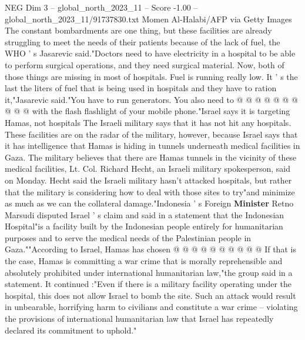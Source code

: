 \begin{textsample}{NEG Dim 3 – global\_north\_2023\_11 – Score -1.00 – global\_north\_2023\_11/91737830.txt}
Momen Al-Halabi/AFP via Getty Images The constant bombardments are one thing, but these facilities are already struggling to meet the needs of their patients because of the lack of fuel, the WHO ' s Jasarevic said."Doctors need to have electricity in a hospital to be able to perform surgical operations, and they need surgical material.
Now, both of those things are missing in most of hospitals.
Fuel is running really low.
It ' s the last the liters of fuel that is being used in hospitals and they have to ration it,"Jasarevic said."You have to run generators.
You also need to @ @ @ @ @ @ @ @ @ @ with the flash flashlight of your mobile phone."Israel says it is targeting Hamas, not hospitals The Israeli military says that it has not hit any hospitals.
These facilities are on the radar of the military, however, because Israel says that it has intelligence that Hamas is hiding in tunnels underneath medical facilities in Gaza.
The military believes that there are Hamas tunnels in the vicinity of these medical facilities, Lt.
Col.
Richard Hecht, an Israeli military spokesperson, said on Monday.
Hecht said the Israeli military hasn't attacked hospitals, but rather that the military is considering how to deal with those sites to try"and minimize as much as we can the collateral damage."Indonesia ' s Foreign \textbf{Minister} Retno Marsudi disputed Israel ' s claim and said in a statement that the Indonesian Hospital"is a facility built by the Indonesian people entirely for humanitarian purposes and to serve the medical needs of the Palestinian people in Gaza.""According to Israel, Hamas has chosen @ @ @ @ @ @ @ @ @ @ If that is the case, Hamas is committing a war crime that is morally reprehensible and absolutely prohibited under international humanitarian law,"the group said in a statement.
It continued :"Even if there is a military facility operating under the hospital, this does not allow Israel to bomb the site.
Such an attack would result in unbearable, horrifying harm to civilians and constitute a war crime -- violating the provisions of international humanitarian law that Israel has repeatedly declared its commitment to uphold."

\end{textsample}
